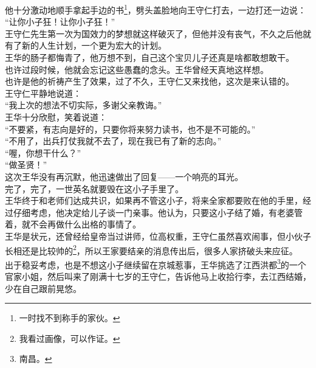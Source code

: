 \begin{multicols}{\theparacolNo}
他十分激动地顺手拿起手边的书\footnote{一时找不到称手的家伙。}，劈头盖脸地向王守仁打去，一边打还一边说：\\

“让你小子狂！让你小子狂！”\\

王守仁先生第一次为国效力的梦想就这样破灭了，但他并没有丧气，不久之后他就有了新的人生计划，一个更为宏大的计划。\\

王华的肠子都悔青了，他万想不到，自己这个宝贝儿子还真是啥都敢想敢干。\\

也许过段时候，他就会忘记这些愚蠢的念头。王华曾经天真地这样想。\\

也许是他的祈祷产生了效果，过了不久，王守仁又来找他，这次是来认错的。\\

王守仁平静地说道：\\

“我上次的想法不切实际，多谢父亲教诲。”\\

王华十分欣慰，笑着说道：\\

“不要紧，有志向是好的，只要你将来努力读书，也不是不可能的。”\\

“不用了，出兵打仗我就不去了，现在我已有了新的志向。”\\

“喔，你想干什么？”\\

“做圣贤！”\\

这次王华没有再沉默，他迅速做出了回复——一个响亮的耳光。\\

完了，完了，一世英名就要毁在这小子手里了。\\

王华终于和老师们达成共识，如果再不管这小子，将来全家都要败在他的手里，经过仔细考虑，他决定给儿子谈一门亲事。他认为，只要这小子结了婚，有老婆管着，就不会再做什么出格的事情了。\\

王华是状元，还曾经给皇帝当过讲师，位高权重，王守仁虽然喜欢闹事，但小伙子长相还是比较帅的\footnote{我看过画像，可以作证。}，所以王家要结亲的消息传出后，很多人家挤破头来应征。\\

出于稳妥考虑，也是不想这小子继续留在京城惹事，王华挑选了江西洪都\footnote{南昌。}的一个官家小姐，然后叫来了刚满十七岁的王守仁，告诉他马上收拾行李，去江西结婚，少在自己跟前晃悠。\\


\end{multicols}
